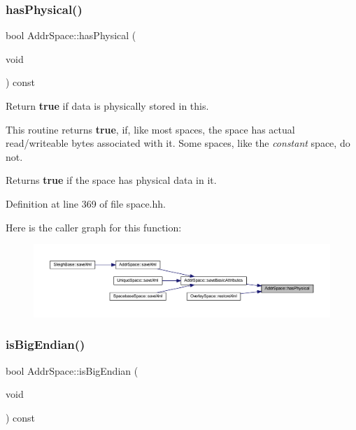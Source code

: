 \subsubsection{\texorpdfstring{hasPhysical()}{hasPhysical()}}
{\footnotesize\ttfamily bool Addr\+Space\+::has\+Physical (\begin{DoxyParamCaption}\item[{void}]{ }\end{DoxyParamCaption}) const\hspace{0.3cm}{\ttfamily [inline]}}



Return {\bfseries{true}} if data is physically stored in this. 

This routine returns {\bfseries{true}}, if, like most spaces, the space has actual read/writeable bytes associated with it. Some spaces, like the {\itshape constant} space, do not. \begin{DoxyReturn}{Returns}
{\bfseries{true}} if the space has physical data in it. 
\end{DoxyReturn}


Definition at line 369 of file space.\+hh.

Here is the caller graph for this function\+:
\nopagebreak
\begin{figure}[H]
\begin{center}
\leavevmode
\includegraphics[width=350pt]{class_addr_space_a1e506360f315658ac46593d12c20a4e0_icgraph}
\end{center}
\end{figure}
\mbox{\label{class_addr_space_af5683c0d7e42edec80b97bcb9fb3dc11}} 
\subsubsection{\texorpdfstring{isBigEndian()}{isBigEndian()}}
{\footnotesize\ttfamily bool Addr\+Space\+::is\+Big\+Endian (\begin{DoxyParamCaption}\item[{void}]{ }\end{DoxyParamCaption}) const\hspace{0.3cm}{\ttfamily [inline]}}




